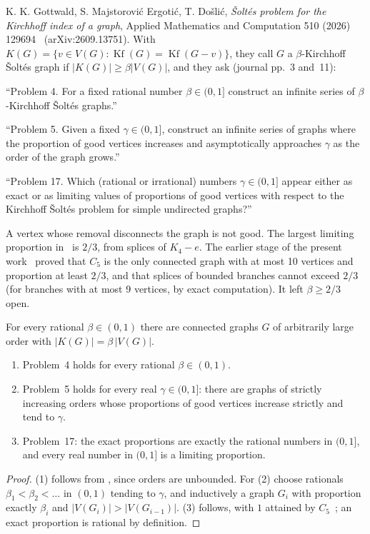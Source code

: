 \documentclass[11pt,a4paper]{report}
\newcommand*{\Kf}{\operatorname{Kf}}
\begin{document}
K. K. Gottwald, S. Majstorović Ergotić, T. Došlić, \emph{Šoltés problem for the Kirchhoff index of a graph}, Applied
Mathematics and Computation 510 (2026) 129694~\autocite{GMD2026} (arXiv:2609.13751). With
\(K(G)=\{v\in V(G):\Kf(G)=\Kf(G-v)\}\), they call \(G\) a \(\beta\)-Kirchhoff Šoltés graph if \(|K(G)|\ge\beta|V(G)|\), and
they ask (journal pp.~3 and~11):
\begin{openquote}
``Problem 4. For a fixed rational number \(\beta\in(0,1]\) construct an infinite series of \(\beta\)-Kirchhoff Šoltés graphs.''

``Problem 5. Given a fixed \(\gamma\in(0,1]\), construct an infinite series of graphs where the proportion of good vertices
increases and asymptotically approaches \(\gamma\) as the order of the graph grows.''

``Problem 17. Which (rational or irrational) numbers \(\gamma\in(0,1]\) appear either as exact or as limiting values of
proportions of good vertices with respect to the Kirchhoff Šoltés problem for simple undirected graphs?''
\end{openquote}
A vertex whose removal disconnects the graph is not good. The largest limiting proportion in~\autocite{GMD2026} is
\(2/3\), from splices of \(K_4-e\). The earlier stage of the present work~\autocite{ParentResult} proved that \(C_5\) is
the only connected graph with at most 10 vertices and proportion at least \(2/3\), and that splices of bounded branches
cannot exceed \(2/3\) (for branches with at most 9 vertices, by exact computation). It left \(\beta\ge2/3\) open.

\begin{theorem}\label{thm:main}
For every rational \(\beta\in(0,1)\) there are connected graphs \(G\) of arbitrarily large order with
\(|K(G)|=\beta\,|V(G)|\).
\end{theorem}

\begin{corollary}\label{cor:problems}
\begin{enumerate}
\item Problem~4 holds for every rational \(\beta\in(0,1)\).
\item Problem~5 holds for every real \(\gamma\in(0,1]\): there are graphs of strictly increasing orders whose proportions
of good vertices increase strictly and tend to \(\gamma\).
\item Problem~17: the exact proportions are exactly the rational numbers in \((0,1]\), and every real number in \((0,1]\) is
a limiting proportion.
\end{enumerate}
\end{corollary}
\begin{proof}
(1) follows from , since orders are unbounded. For (2) choose rationals \(\beta_1<\beta_2<\dots\) in
\((0,1)\) tending to \(\gamma\), and inductively a graph \(G_i\) with proportion exactly \(\beta_i\) and
\(|V(G_i)|>|V(G_{i-1})|\). (3) follows, with \(1\) attained by \(C_5\)~\autocite{GMD2026}; an exact proportion is
rational by definition.
\end{proof}
\end{document}
